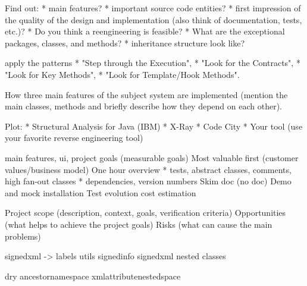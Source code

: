 Find out:
* main features?
* important source code entities?
* first impression of the quality of the design and implementation (also think of documentation, tests, etc.)?
* Do you think a reengineering is feasible?
* What are the exceptional packages, classes, and methods?
* inheritance structure look like?

apply the patterns 
* "Step through the Execution",
* "Look for the Contracts", 
* "Look for Key Methods", 
* "Look for Template/Hook Methods". 

How three main features of the subject system are implemented 
(mention the main classes, methods and briefly describe how they depend on each other).

Plot:
* Structural Analysis for Java (IBM)
* X-Ray
* Code City
* Your tool (use your favorite reverse engineering tool)

main features, ui, project goals (measurable goals)
Most valuable first (customer values/business model)
One hour overview
    * tests, abstract classes, comments, high fan-out classes
    * dependencies, version numbers
Skim doc (no doc)
Demo and mock installation
Test evolution
cost estimation

Project scope (description, context, goals, verification criteria)
Opportunities (what helps to achieve the project goals)
Risks (what can cause the main problems)

\begin{comment}
\chapter{Reverse Engineering}

Is the process of analyzing a subject system to identify the system components and their 
interrelationships and create representations of the system in another form or at higher 
level of abstraction.

It is an iterative process

* Persistent data
* Draw classes (sort by size/loc) color 
* Contracts
* Git history (pulsars)


---------------

Problem detection
Requirement analysis
Problem resolution

# Tests

Write tests
TDD 
\end{comment}

signedxml -> labels
utils
signedinfo
signedxml nested classes

dry ancestornamespace xmlattributenestedspace